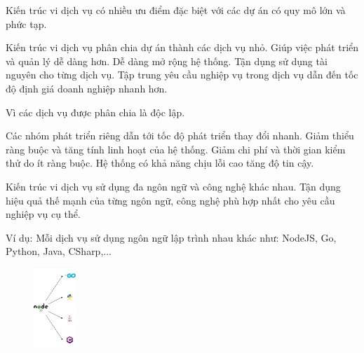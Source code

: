 Kiến trúc vi dịch vụ có nhiều ưu điểm đặc biệt với các dự án có quy mô lớn và phức tạp.

Kiến trúc vi dịch vụ phân chia dự án thành các dịch vụ nhỏ.
Giúp việc phát triển và quản lý dễ dàng hơn.
Dễ dàng mở rộng hệ thống.
Tận dụng sử dụng tài nguyên cho từng dịch vụ.
Tập trung yêu cầu nghiệp vụ trong dịch vụ dẫn đến tốc độ định giá doanh nghiệp nhanh hơn.

Vì các dịch vụ được phân chia là độc lập.



Các nhóm phát triển riêng dẫn tới tốc độ phát triển thay đổi nhanh.
Giảm thiểu ràng buộc và tăng tính linh hoạt của hệ thống.
Giảm chi phí và thời gian kiểm thử do ít ràng buộc.
Hệ thống có khả năng chịu lỗi cao tăng độ tin cậy.

Kiến trúc vi dịch vụ sử dụng đa ngôn ngữ và công nghệ khác nhau.
Tận dụng hiệu quả thế mạnh của từng ngôn ngữ, công nghệ phù hợp nhất cho yêu cầu nghiệp vụ cụ thể.

Ví dụ: Mỗi dịch vụ sử dụng ngôn ngữ lập trình nhau khác như: NodeJS, Go, Python, Java, CSharp,...

\begin{figure}[h]
\centering
\includegraphics[height = 3cm]{pictures/DaNgonNgu/_DaNgonNgu.png}
\end{figure}

